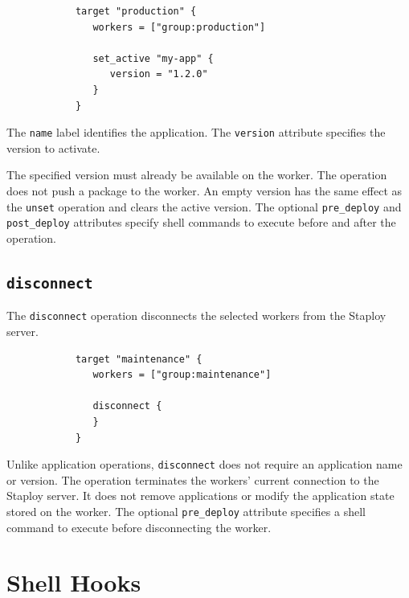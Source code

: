 \documentclass[11pt,a4paper]{article}
\begin{document}
    \begin{center}
        \begin{verbatim}
            target "production" {
               workers = ["group:production"]

               set_active "my-app" {
                  version = "1.2.0"
               }
            }
        \end{verbatim}
    \end{center}

    The \texttt{name} label identifies the application.
    The \texttt{version} attribute specifies the version to activate.

    The specified version must already be available on the worker.
    The operation does not push a package to the worker.
    An empty version has the same effect as the \texttt{unset} operation and clears the active version.
    The optional \texttt{pre\_deploy} and \texttt{post\_deploy} attributes specify shell commands to execute before and after the operation.

    \subsection{\texttt{disconnect}}\label{subsec:texttt:disconnect}

    The \texttt{disconnect} operation disconnects the selected workers from the Staploy server.

    \begin{center}
        \begin{verbatim}
            target "maintenance" {
               workers = ["group:maintenance"]

               disconnect {
               }
            }
        \end{verbatim}
    \end{center}

    Unlike application operations, \texttt{disconnect} does not require an application name or version.
    The operation terminates the workers' current connection to the Staploy server.
    It does not remove applications or modify the application state stored on the worker.
    The optional \texttt{pre\_deploy} attribute specifies a shell command to execute before disconnecting the worker.


    \section{Shell Hooks}\label{sec:shell-hooks}
\end{document}
